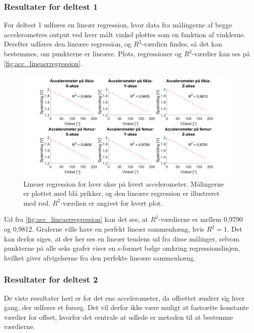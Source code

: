 \subsubsection{Resultater for deltest 1} \label{sec:resul_linear}
For deltest 1 udføres en lineær regression, hvor data fra målingerne af begge accelerometres output ved hver målt vinkel plottes som en funktion af vinklerne. Derefter udføres den lineære regression, og $R^2$-værdien findes, så det kan bestemmes, om punkterne er lineære. Plots, regressioner og $R^2$-værdier kan ses på \autoref{fig:acc_lineaerregression}.

\begin{figure}[H]
\centering
\includegraphics[width=1.0\textwidth]{figures/lineaerregression}
\caption{Lineær regression for hver akse på hvert accelerometer. Målingerne er plottet med blå prikker, og den lineære regression er illustreret med rød. $R^2$-værdien er angivet for hvert plot.}
\label{fig:acc_lineaerregression}
\end{figure}

Ud fra \autoref{fig:acc_lineaerregression} kan det ses, at $R^2$-værdierne er mellem 0,9790 og 0,9812. Graferne ville have en perfekt lineær sammenhæng, hvis $R^2=1$. Det kan derfor siges, at der her ses en lineær tendens ud fra disse målinger, selvom punkterne på alle seks grafer viser en s-formet bølge omkring regressionslinjen, hvilket giver afvigelserne fra den perfekte lineære sammenhæng.

\subsubsection{Resultater for deltest 2}
De viste resultater heri er for det ene accelerometer, da offsettet ændrer sig hver gang, der udføres et forsøg. Det vil derfor ikke være muligt at fastsætte konstante værdier for offset, hvorfor det centrale at udlede er metoden til at bestemme værdierne.

